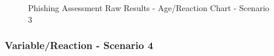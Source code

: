 \documentclass[a4paper]{article}
\begin{document}
\vspace{5mm}

\begin{figure}[H]
	\centering
	\caption{Phishing Assessment Raw Results - Age/Reaction Chart - Scenario 3}
	\label{chart-age-s3}
\end{figure}

\newpage

\subsubsection*{Variable/Reaction - Scenario 4}
\end{document}
